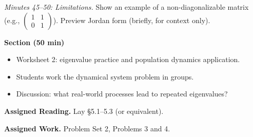 \documentclass{amsart}
\begin{document}
\textit{Minutes 45--50: Limitations.} Show an example of a non-diagonalizable matrix (e.g., $\begin{pmatrix}1&1\\0&1\end{pmatrix}$). Preview Jordan form (briefly, for context only).

\bigskip

\textbf{Section (50 min)}
\begin{itemize}
    \item Worksheet 2: eigenvalue practice and population dynamics application.
    \item Students work the dynamical system problem in groups.
    \item Discussion: what real-world processes lead to repeated eigenvalues?
\end{itemize}

\bigskip

\textbf{Assigned Reading.} Lay \S5.1--5.3 (or equivalent).

\textbf{Assigned Work.} Problem Set 2, Problems 3 and 4.
\end{document}
